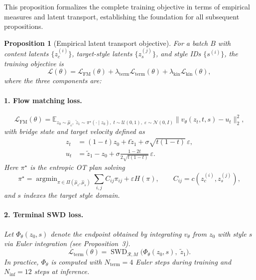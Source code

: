 \documentclass[letterpaper]{article}
\newtheorem{proposition}{Proposition}[section]
\newcommand{\E}{\mathbb{E}}
\newcommand{\SWD}{\operatorname{SWD}}
\newcommand{\cL}{\mathcal{L}}
\newcommand{\cN}{\mathcal{N}}
\newcommand{\argmin}{\operatorname{argmin}}
\begin{document}
This proposition formalizes the complete training objective in terms of
empirical measures and latent transport, establishing the foundation for all
subsequent propositions.

\begin{proposition}[Empirical latent transport objective]
\label{prop:objective}
For a batch $B$ with content latents $\{z_c^{(i)}\}$, target-style latents
$\{z_s^{(j)}\}$, and style IDs $\{s^{(i)}\}$, the training objective is
\begin{equation}
    \cL(\theta) = \cL_{\mathrm{FM}}(\theta) + \lambda_{\text{term}} \cL_{\text{term}}(\theta) + \lambda_{\text{kin}} \cL_{\text{kin}}(\theta),
    \label{eq:full_objective}
\end{equation}
where the three components are:

\paragraph{1. Flow matching loss.}
\begin{equation}
    \cL_{\mathrm{FM}}(\theta) = \E_{z_0 \sim \hat\mu_c,\; \tilde z_1 \sim \pi^\star(\cdot \mid z_0),\; t \sim \mathcal{U}(0,1),\; \varepsilon \sim \cN(0,I)}
    \bigl\| v_\theta(z_t, t, s) - u_t \bigr\|_2^2,
\end{equation}
with bridge state and target velocity defined as
\begin{align}
    z_t &= (1-t) z_0 + t \tilde z_1 + \sigma \sqrt{t(1-t)}\,\varepsilon,
    \label{eq:bridge_state} \\
    u_t &= \tilde z_1 - z_0 + \sigma \frac{1-2t}{2\sqrt{t(1-t)}}\,\varepsilon.
    \label{eq:target_velocity}
\end{align}
Here $\pi^\star$ is the entropic OT plan solving
\begin{equation}
    \pi^\star = \argmin_{\pi \in \Pi(\hat\mu_c, \hat\mu_s)} \sum_{i,j} C_{ij}\pi_{ij} + \varepsilon H(\pi),
    \qquad C_{ij} = c(z_c^{(i)}, z_s^{(j)}),
\end{equation}
and $s$ indexes the target style domain.

\paragraph{2. Terminal SWD loss.}
Let $\Phi_\theta(z_0, s)$ denote the endpoint obtained by integrating $v_\theta$
from $z_0$ with style $s$ via Euler integration (see Proposition~3).
\begin{equation}
    \cL_{\text{term}}(\theta) = \SWD_{\mathcal{R}, M}\bigl( \Phi_\theta(z_0, s),\; \tilde z_1 \bigr).
    \label{eq:terminal_swd}
\end{equation}
In practice, $\Phi_\theta$ is computed with $N_{\text{term}} = 4$ Euler steps
during training and $N_{\text{inf}} = 12$ steps at inference.


\end{proposition}
\end{document}
